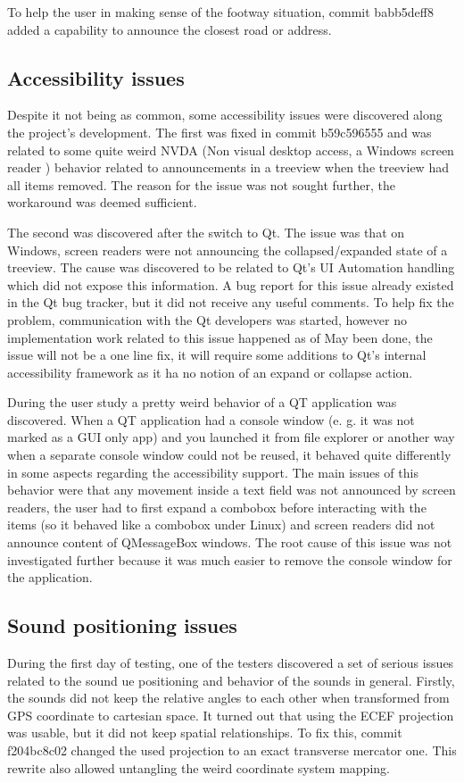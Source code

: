 \documentclass[nolof,digital]{fithesis3}
\begin{document}
To help the user in making sense of the footway situation, commit babb5deff8 added a capability to announce the closest road or address.
\subsection{Accessibility issues}
Despite it not being as common, some accessibility issues were discovered along the project's development. The first was fixed in commit b59c596555 and was related to some quite weird NVDA (Non visual desktop access, a Windows screen reader \parencite{nvda}) behavior related to announcements in a treeview when the treeview had all items removed. The reason for the issue was not sought further, the workaround was deemed sufficient.

The second was discovered after the switch to Qt. The issue was that on Windows, screen readers were not announcing the collapsed/expanded state of a treeview. The cause was discovered to be related to Qt's UI Automation handling which did not expose this information. A bug report for this issue already existed in the Qt bug tracker, but it did not receive any useful comments. To help fix the problem, communication with the Qt developers was started, however no implementation work related to this issue happened as of May been done, the issue will not be a one line fix, it will require some additions to Qt's internal accessibility framework as it ha no notion of an expand or collapse action.

During the user study a pretty weird behavior of a QT application was discovered. When a QT application had a console window (e. g. it was not marked as a GUI only app) and you launched it from file explorer or another way when a separate console window could not be reused, it behaved quite differently in some aspects regarding the accessibility support. The main issues of this behavior were that any movement inside a text field was not announced by screen readers, the user had to first expand a combobox before interacting with the items (so it behaved like a combobox under Linux) and screen readers did not announce content of QMessageBox windows. The root cause of this issue was not investigated further because it was much easier to remove the console window for the application.
\subsection{Sound positioning issues}
During the first day of testing, one of the testers discovered a set of serious issues related to the sound ue positioning and behavior of the sounds in general. Firstly, the sounds did not keep the relative angles to each other when transformed from GPS coordinate to cartesian space. It turned out that using the ECEF projection was usable, but it did not keep spatial relationships. To fix this, commit f204bc8c02 changed the used projection to an exact transverse mercator one. This rewrite also allowed untangling the weird coordinate system mapping.
\end{document}
